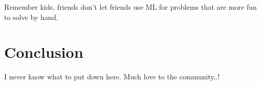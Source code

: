 \documentclass[10pt]{sigplanconf}
\begin{document}
Remember kids, friends don't let friends use ML for problems that are more fun to solve by hand.

\section{Conclusion}

I never know what to put down here. Much love to the community..!





\end{document}
